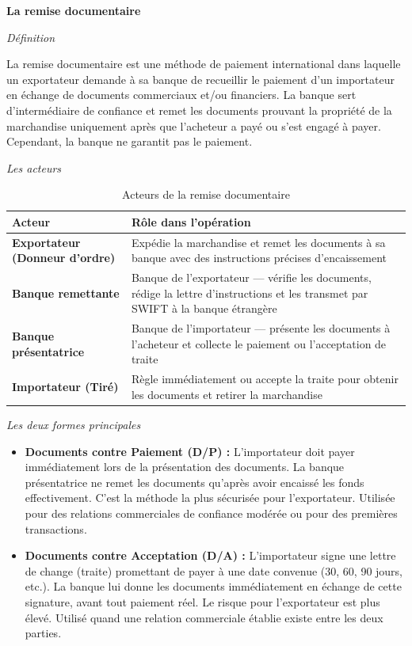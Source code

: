 \documentclass[12pt,a4paper]{report}
\begin{document}
\medskip\textbf{La remise documentaire}

\medskip\textit{Définition}

La remise documentaire est une méthode de paiement international dans laquelle un exportateur demande à sa banque de recueillir le paiement d'un importateur en échange de documents commerciaux et/ou financiers. La banque sert d'intermédiaire de confiance et remet les documents prouvant la propriété de la marchandise uniquement après que l'acheteur a payé ou s'est engagé à payer. Cependant, la banque ne garantit pas le paiement.

\medskip\textit{Les acteurs}

\begin{table}[h!]
\centering
\begin{tabularx}{\textwidth}{>{\bfseries}l X}
\toprule
Acteur & Rôle dans l'opération \\
\midrule
Exportateur (Donneur d'ordre) & Expédie la marchandise et remet les documents à sa banque avec des instructions précises d'encaissement \\
\addlinespace
Banque remettante & Banque de l'exportateur --- vérifie les documents, rédige la lettre d'instructions et les transmet par SWIFT à la banque étrangère \\
\addlinespace
Banque présentatrice & Banque de l'importateur --- présente les documents à l'acheteur et collecte le paiement ou l'acceptation de traite \\
\addlinespace
Importateur (Tiré) & Règle immédiatement ou accepte la traite pour obtenir les documents et retirer la marchandise \\
\bottomrule
\end{tabularx}
\caption{Acteurs de la remise documentaire}
\end{table}

\medskip\textit{Les deux formes principales}

\begin{itemize}
  \item \textbf{Documents contre Paiement (D/P) :} L'importateur doit payer immédiatement lors de la présentation des documents. La banque présentatrice ne remet les documents qu'après avoir encaissé les fonds effectivement. C'est la méthode la plus sécurisée pour l'exportateur. Utilisée pour des relations commerciales de confiance modérée ou pour des premières transactions.

  \item \textbf{Documents contre Acceptation (D/A) :} L'importateur signe une lettre de change (traite) promettant de payer à une date convenue (30, 60, 90 jours, etc.). La banque lui donne les documents immédiatement en échange de cette signature, avant tout paiement réel. Le risque pour l'exportateur est plus élevé. Utilisé quand une relation commerciale établie existe entre les deux parties.
\end{itemize}
\end{document}
